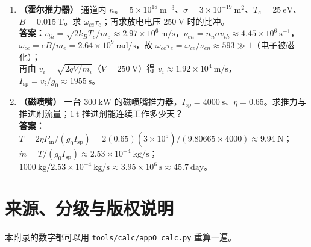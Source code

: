 \begin{enumerate}
\item \textbf{（霍尔推力器）} 通道内 $n_n=5\times10^{18}\ \mathrm{m^{-3}}$、$\sigma=3\times10^{-19}\ \mathrm{m^2}$、$T_e=25\ \mathrm{eV}$、$B=0.015\ \mathrm{T}$。求 $\omega_{ce}\tau_e$；再求放电电压 $250\ \mathrm{V}$ 时的比冲。\\
\textbf{答案：}$v_{th}=\sqrt{2k_BT_e/m_e}\approx2.97\times10^{6}\ \mathrm{m/s}$，$\nu_{en}=n_n\sigma v_{th}\approx4.45\times10^{6}\ \mathrm{s^{-1}}$，$\omega_{ce}=eB/m_e=2.64\times10^{9}\ \mathrm{rad/s}$，故 $\omega_{ce}\tau_e=\omega_{ce}/\nu_{en}\approx593\gg1$（电子被磁化）；\\
再由 $v_i=\sqrt{2qV/m_i}$（$V=250\ \mathrm{V}$）得 $v_i\approx1.92\times10^{4}\ \mathrm{m/s}$，$I_{\mathrm{sp}}=v_i/g_0\approx1955\ \mathrm{s}$。

\item \textbf{（磁喷嘴）} 一台 $300\ \mathrm{kW}$ 的磁喷嘴推力器，$I_{\mathrm{sp}}=4000\ \mathrm{s}$、$\eta=0.65$。求推力与推进剂流量；$1\ \mathrm{t}$ 推进剂能连续工作多少天？\\
\textbf{答案：}$T=2\eta P_{\mathrm{in}}/(g_0I_{\mathrm{sp}})=2(0.65)(3\times10^{5})/(9.80665\times4000)\approx9.94\ \mathrm{N}$；$\dot m=T/(g_0I_{\mathrm{sp}})\approx2.53\times10^{-4}\ \mathrm{kg/s}$；$1000\ \mathrm{kg}/2.53\times10^{-4}\ \mathrm{kg/s}\approx3.95\times10^{6}\ \mathrm{s}\approx45.7\ \mathrm{day}$。
\end{enumerate}


\section{来源、分级与版权说明}

\begingroup\small
本附录的数字都可以用 \texttt{tools/\allowbreak{}calc/\allowbreak{}appO\_calc.py} 重算一遍。

